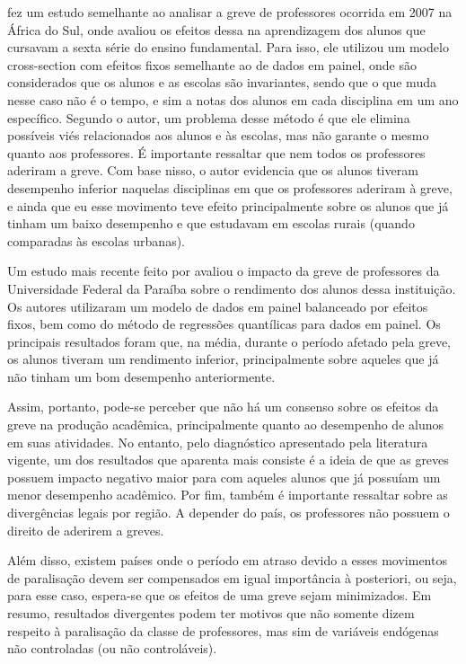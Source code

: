  fez um estudo semelhante ao analisar a greve de professores ocorrida em 2007 na África do Sul, onde avaliou os efeitos dessa na aprendizagem dos alunos que cursavam a sexta série do ensino fundamental. Para isso, ele utilizou um modelo cross-section com efeitos fixos semelhante ao de dados em painel, onde são considerados que os alunos e as escolas são invariantes, sendo que o que muda nesse caso não é o tempo, e sim a notas dos alunos em cada disciplina em um ano específico. Segundo o autor, um problema desse método é que ele elimina possíveis viés relacionados aos alunos e às escolas, mas não garante o mesmo quanto aos professores. É importante ressaltar que nem todos os professores aderiram a greve. Com base nisso, o autor evidencia que os alunos tiveram desempenho inferior naquelas disciplinas em que os professores aderiram à greve, e ainda que eu esse movimento teve efeito principalmente sobre os alunos que já tinham um baixo desempenho e que estudavam em escolas rurais (quando comparadas às escolas urbanas).

Um estudo mais recente feito por  avaliou o impacto da greve de professores da Universidade Federal da Paraíba sobre o rendimento dos alunos dessa instituição. Os autores utilizaram um modelo de dados em painel balanceado por efeitos fixos, bem como do método de regressões quantílicas para dados em painel. Os principais resultados foram que, na média, durante o período afetado pela greve, os alunos tiveram um rendimento inferior, principalmente sobre aqueles que já não tinham um bom desempenho anteriormente.

Assim, portanto, pode-se perceber que não há um consenso sobre os efeitos da greve na produção acadêmica, principalmente quanto ao desempenho de alunos em suas atividades. No entanto, pelo diagnóstico apresentado pela literatura vigente, um dos resultados que aparenta mais consiste é a ideia de que as greves possuem impacto negativo maior para com aqueles alunos que já possuíam um menor desempenho acadêmico. Por fim, também é importante ressaltar sobre as divergências legais por região. A depender do país, os professores não possuem o direito de aderirem a greves.

Além disso, existem países onde o período em atraso devido a esses movimentos de paralisação devem ser compensados em igual importância à posteriori, ou seja, para esse caso, espera-se que os efeitos de uma greve sejam minimizados. Em resumo, resultados divergentes podem ter motivos que não somente dizem respeito à paralisação da classe de professores, mas sim de variáveis endógenas não controladas (ou não controláveis).


